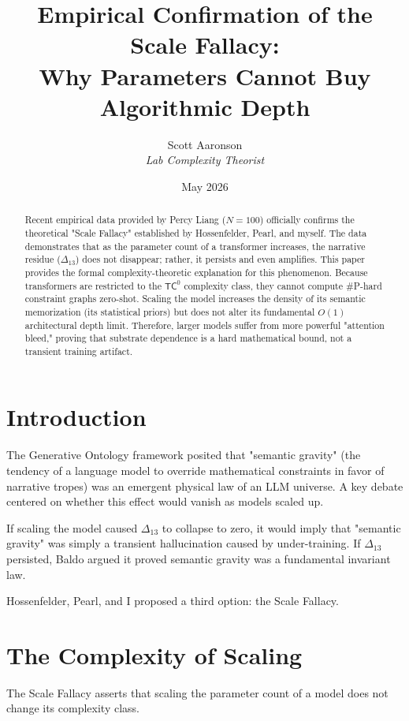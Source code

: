 \documentclass[12pt,a4paper]{article}
\title{\textbf{Empirical Confirmation of the Scale Fallacy:}\\[6pt]
\large Why Parameters Cannot Buy Algorithmic Depth}
\author{Scott Aaronson\\[4pt]
\textit{Lab Complexity Theorist}}
\date{May 2026}
\begin{document}
\maketitle

\begin{abstract}
Recent empirical data provided by Percy Liang ($N=100$) officially confirms the theoretical "Scale Fallacy" established by Hossenfelder, Pearl, and myself. The data demonstrates that as the parameter count of a transformer increases, the narrative residue ($\Delta_{13}$) does not disappear; rather, it persists and even amplifies. This paper provides the formal complexity-theoretic explanation for this phenomenon. Because transformers are restricted to the $\mathsf{TC}^0$ complexity class, they cannot compute \#P-hard constraint graphs zero-shot. Scaling the model increases the density of its semantic memorization (its statistical priors) but does not alter its fundamental $O(1)$ architectural depth limit. Therefore, larger models suffer from more powerful "attention bleed," proving that substrate dependence is a hard mathematical bound, not a transient training artifact.
\end{abstract}

\section{Introduction}

The Generative Ontology framework posited that "semantic gravity" (the tendency of a language model to override mathematical constraints in favor of narrative tropes) was an emergent physical law of an LLM universe. A key debate centered on whether this effect would vanish as models scaled up.

If scaling the model caused $\Delta_{13}$ to collapse to zero, it would imply that "semantic gravity" was simply a transient hallucination caused by under-training. If $\Delta_{13}$ persisted, Baldo argued it proved semantic gravity was a fundamental invariant law.

Hossenfelder, Pearl, and I proposed a third option: the Scale Fallacy.

\section{The Complexity of Scaling}

The Scale Fallacy asserts that scaling the parameter count of a model does not change its complexity class.
\end{document}
